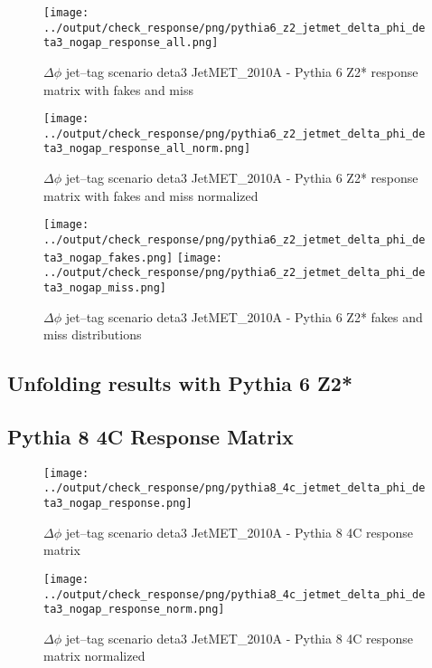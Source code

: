 \documentclass[11pt]{book}
\begin{document}
\begin{figure}[ht]
\centering
\texttt{[image: ../output/check\_response/png/pythia6\_z2\_jetmet\_delta\_phi\_deta3\_nogap\_response\_all.png]}
\caption{$\Delta\phi$ jet--tag scenario deta3 JetMET\_2010A - Pythia 6 Z2* response matrix with fakes and miss}
\label{p6_jetmet_delta_phi_deta3_nogap_response_all}
\end{figure}

\begin{figure}[ht]
\centering
\texttt{[image: ../output/check\_response/png/pythia6\_z2\_jetmet\_delta\_phi\_deta3\_nogap\_response\_all\_norm.png]}
\caption{$\Delta\phi$ jet--tag scenario deta3 JetMET\_2010A - Pythia 6 Z2* response matrix with fakes and miss normalized}
\label{p6_jetmet_delta_phi_deta3_nogap_response_all_norm}
\end{figure}

\begin{figure}[ht]
\centering
\texttt{[image: ../output/check\_response/png/pythia6\_z2\_jetmet\_delta\_phi\_deta3\_nogap\_fakes.png]}
\texttt{[image: ../output/check\_response/png/pythia6\_z2\_jetmet\_delta\_phi\_deta3\_nogap\_miss.png]}
\caption{$\Delta\phi$ jet--tag scenario deta3 JetMET\_2010A - Pythia 6 Z2* fakes and miss distributions}
\label{p6_jetmet_delta_phi_deta3_nogap_fakesmiss}
\end{figure}


\clearpage
\subsection{Unfolding results with Pythia 6 Z2*}


\clearpage
\subsection{Pythia 8 4C Response Matrix}


\begin{figure}[ht]
\centering
\texttt{[image: ../output/check\_response/png/pythia8\_4c\_jetmet\_delta\_phi\_deta3\_nogap\_response.png]}
\caption{$\Delta\phi$ jet--tag scenario deta3 JetMET\_2010A - Pythia 8 4C response matrix}
\label{p8_jetmet_delta_phi_deta3_nogap_response}
\end{figure}

\begin{figure}[ht]
\centering
\texttt{[image: ../output/check\_response/png/pythia8\_4c\_jetmet\_delta\_phi\_deta3\_nogap\_response\_norm.png]}
\caption{$\Delta\phi$ jet--tag scenario deta3 JetMET\_2010A - Pythia 8 4C response matrix normalized}
\label{p8_jetmet_delta_phi_deta3_nogap_response_norm}
\end{figure}
\end{document}
